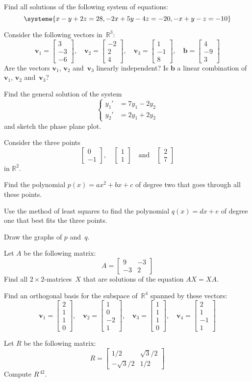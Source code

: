 \documentclass[titlepage,a4paper,12pt,english]{IMFeksamen}
\newcommand{\R}{\mathbb{R}}
\newcommand{\V}[1]{\mathbf{#1}}
\newcommand{\vv}[2]{\begin{bmatrix} #1 \\ #2 \end{bmatrix}}
\newcommand{\vvv}[3]{\begin{bmatrix} #1 \\ #2 \\ #3 \end{bmatrix}}
\newcommand{\vvvv}[4]{\begin{bmatrix} #1 \\ #2 \\ #3 \\ #4 \end{bmatrix}}
\renewcommand{\v}{\V{v}}
\renewcommand{\b}{\V{b}}
\newcommand{\0}{\V{0}}
\begin{document}
\begin{oppgave}
Find all solutions of the following system of equations:
\[
\systeme{
x - y + 2z = 28,
-2x + 5y - 4z = -20,
-x + y - z = -10
}
\]
\end{oppgave}


\begin{oppgave}
Consider the following vectors in~$\R^3$:
\[
\v_1 = \vvv{3}{-3}{-6},\quad
\v_2 = \vvv{-2}{2}{4},\quad
\v_3 = \vvv{1}{-1}{8},\quad
\b = \vvv{4}{-9}{3}
\]
Are the vectors $\v_1$, $\v_2$ and~$\v_3$ linearly independent?
Is $\b$ a linear combination of $\v_1$, $\v_2$ and~$\v_3$?
\end{oppgave}


\begin{oppgave}
Find the general solution of the system
\[
\left\{
\begin{aligned}
y_1' &= 7 y_1 - 2 y_2 \\
y_2' &= 2 y_1 + 2 y_2
\end{aligned}
\right.
\]
and sketch the phase plane plot.
\end{oppgave}


\begin{oppgave}
Consider the three points
\[
\vv{0}{-1},\quad
\vv{1}{1}\quad\text{and}\quad
\vv{2}{7}
\]
in $\R^2$.

Find the polynomial
$p(x) = ax^2 + bx + c$
of degree two that goes through all these points.

Use the method of least squares to find the polynomial
$q(x) = dx + e$
of degree one that best fits the three points.

Draw the graphs of $p$ and~$q$.
\end{oppgave}


\begin{oppgave}
Let $A$ be the following matrix:
\[
A =
\begin{bmatrix}
 9 & -3 \\
-3 &  2
\end{bmatrix}
\]
Find all $2 \times 2$-matrices~$X$ that are solutions of the equation
$AX = XA$.
\end{oppgave}


\begin{oppgave}
Find an orthogonal basis for the subspace of~$\R^4$ spanned by
these vectors:
\[
\v_1 = \vvvv{2}{1}{1}{0},\quad
\v_2 = \vvvv{1}{0}{-2}{1},\quad
\v_3 = \vvvv{1}{1}{1}{0},\quad
\v_4 = \vvvv{2}{1}{-1}{1}
\]
\end{oppgave}


\begin{oppgave}
Let $R$ be the following matrix:
\[
R =
\begin{bmatrix}
        1/2 & \sqrt{3}/2 \\
-\sqrt{3}/2 &        1/2
\end{bmatrix}
\]
Compute $R^{\,42}$.
\end{oppgave}
\end{document}
